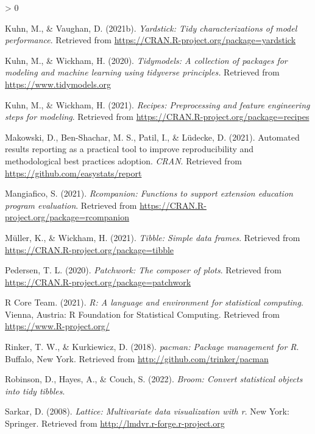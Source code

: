 \documentclass[
  english,
  doc,floatsintext]{apa6}
\newlength{\cslhangindent}
\newenvironment{CSLReferences}[2] %
 {%
  \setlength{\parindent}{0pt}
  \ifodd #1 \everypar{\setlength{\hangindent}{\cslhangindent}}\ignorespaces\fi
  \ifnum #2 > 0
  \setlength{\parskip}{#2\baselineskip}
  \fi
 }%
 {}
\begin{document}
\begin{CSLReferences}{1}{0}
\leavevmode\hypertarget{ref-R-yardstick}{}%
Kuhn, M., \& Vaughan, D. (2021b). \emph{Yardstick: Tidy characterizations of model performance}. Retrieved from \url{https://CRAN.R-project.org/package=yardstick}

\leavevmode\hypertarget{ref-R-tidymodels}{}%
Kuhn, M., \& Wickham, H. (2020). \emph{Tidymodels: A collection of packages for modeling and machine learning using tidyverse principles.} Retrieved from \url{https://www.tidymodels.org}

\leavevmode\hypertarget{ref-R-recipes}{}%
Kuhn, M., \& Wickham, H. (2021). \emph{Recipes: Preprocessing and feature engineering steps for modeling}. Retrieved from \url{https://CRAN.R-project.org/package=recipes}

\leavevmode\hypertarget{ref-R-report}{}%
Makowski, D., Ben-Shachar, M. S., Patil, I., \& Lüdecke, D. (2021). Automated results reporting as a practical tool to improve reproducibility and methodological best practices adoption. \emph{CRAN}. Retrieved from \url{https://github.com/easystats/report}

\leavevmode\hypertarget{ref-R-rcompanion}{}%
Mangiafico, S. (2021). \emph{Rcompanion: Functions to support extension education program evaluation}. Retrieved from \url{https://CRAN.R-project.org/package=rcompanion}

\leavevmode\hypertarget{ref-R-tibble}{}%
Müller, K., \& Wickham, H. (2021). \emph{Tibble: Simple data frames}. Retrieved from \url{https://CRAN.R-project.org/package=tibble}

\leavevmode\hypertarget{ref-R-patchwork}{}%
Pedersen, T. L. (2020). \emph{Patchwork: The composer of plots}. Retrieved from \url{https://CRAN.R-project.org/package=patchwork}

\leavevmode\hypertarget{ref-R-base}{}%
R Core Team. (2021). \emph{R: A language and environment for statistical computing}. Vienna, Austria: R Foundation for Statistical Computing. Retrieved from \url{https://www.R-project.org/}

\leavevmode\hypertarget{ref-R-pacman}{}%
Rinker, T. W., \& Kurkiewicz, D. (2018). \emph{{pacman}: {P}ackage management for {R}}. Buffalo, New York. Retrieved from \url{http://github.com/trinker/pacman}

\leavevmode\hypertarget{ref-R-broom}{}%
Robinson, D., Hayes, A., \& Couch, S. (2022). \emph{Broom: Convert statistical objects into tidy tibbles}.

\leavevmode\hypertarget{ref-R-lattice}{}%
Sarkar, D. (2008). \emph{Lattice: Multivariate data visualization with r}. New York: Springer. Retrieved from \url{http://lmdvr.r-forge.r-project.org}


\end{CSLReferences}
\end{document}
